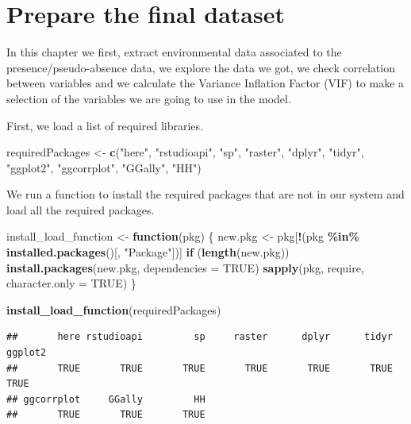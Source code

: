\documentclass[
]{book}
\newenvironment{Shaded}{\begin{snugshade}}{\end{snugshade}}
\newcommand{\AttributeTok}[1]{\textcolor[rgb]{0.13,0.29,0.53}{#1}}
\newcommand{\ConstantTok}[1]{\textcolor[rgb]{0.56,0.35,0.01}{#1}}
\newcommand{\ControlFlowTok}[1]{\textcolor[rgb]{0.13,0.29,0.53}{\textbf{#1}}}
\newcommand{\FunctionTok}[1]{\textcolor[rgb]{0.13,0.29,0.53}{\textbf{#1}}}
\newcommand{\NormalTok}[1]{#1}
\newcommand{\OtherTok}[1]{\textcolor[rgb]{0.56,0.35,0.01}{#1}}
\newcommand{\SpecialCharTok}[1]{\textcolor[rgb]{0.81,0.36,0.00}{\textbf{#1}}}
\newcommand{\StringTok}[1]{\textcolor[rgb]{0.31,0.60,0.02}{#1}}
\begin{document}
\chapter{Prepare the final dataset}\label{prepare-the-final-dataset}

In this chapter we first, extract environmental data associated to the presence/pseudo-absence data, we explore the data we got, we check correlation between variables and we calculate the Variance Inflation Factor (VIF) to make a selection of the variables we are going to use in the model.

First, we load a list of required libraries.

\begin{Shaded}
\begin{Highlighting}[]
\NormalTok{requiredPackages }\OtherTok{\textless{}{-}} \FunctionTok{c}\NormalTok{(}\StringTok{"here"}\NormalTok{, }\StringTok{"rstudioapi"}\NormalTok{,}
    \StringTok{"sp"}\NormalTok{, }\StringTok{"raster"}\NormalTok{, }\StringTok{"dplyr"}\NormalTok{, }\StringTok{"tidyr"}\NormalTok{, }\StringTok{"ggplot2"}\NormalTok{,}
    \StringTok{"ggcorrplot"}\NormalTok{, }\StringTok{"GGally"}\NormalTok{, }\StringTok{"HH"}\NormalTok{)}
\end{Highlighting}
\end{Shaded}

We run a function to install the required packages that are not in our system and load all the required packages.

\begin{Shaded}
\begin{Highlighting}[]
\NormalTok{install\_load\_function }\OtherTok{\textless{}{-}} \ControlFlowTok{function}\NormalTok{(pkg) \{}
\NormalTok{    new.pkg }\OtherTok{\textless{}{-}}\NormalTok{ pkg[}\SpecialCharTok{!}\NormalTok{(pkg }\SpecialCharTok{\%in\%} \FunctionTok{installed.packages}\NormalTok{()[,}
        \StringTok{"Package"}\NormalTok{])]}
    \ControlFlowTok{if}\NormalTok{ (}\FunctionTok{length}\NormalTok{(new.pkg))}
        \FunctionTok{install.packages}\NormalTok{(new.pkg, }\AttributeTok{dependencies =} \ConstantTok{TRUE}\NormalTok{)}
    \FunctionTok{sapply}\NormalTok{(pkg, require, }\AttributeTok{character.only =} \ConstantTok{TRUE}\NormalTok{)}
\NormalTok{\}}

\FunctionTok{install\_load\_function}\NormalTok{(requiredPackages)}
\end{Highlighting}
\end{Shaded}

\begin{verbatim}
##       here rstudioapi         sp     raster      dplyr      tidyr    ggplot2 
##       TRUE       TRUE       TRUE       TRUE       TRUE       TRUE       TRUE 
## ggcorrplot     GGally         HH 
##       TRUE       TRUE       TRUE
\end{verbatim}
\end{document}
